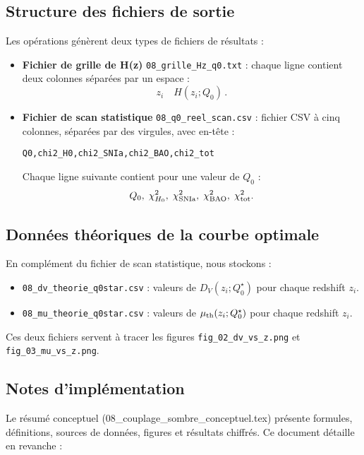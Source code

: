 \subsection{Structure des fichiers de sortie}

Les opérations génèrent deux types de fichiers de résultats :

\begin{itemize}
  \item \textbf{Fichier de grille de H(z)}  
    \texttt{08\_grille\_Hz\_q0.txt} : chaque ligne contient deux colonnes séparées par un espace :
    \[
      z_i 
      \quad H(z_i;Q_{0})\,.
    \]

  \item \textbf{Fichier de scan statistique}  
    \texttt{08\_q0\_reel\_scan.csv} : fichier CSV à cinq colonnes, séparées par des virgules, avec en-tête :
    \begin{verbatim}
Q0,chi2_H0,chi2_SNIa,chi2_BAO,chi2_tot
    \end{verbatim}
    Chaque ligne suivante contient pour une valeur de \(Q_{0}\) :
    \[
      Q_{0},\;\chi^{2}_{H_{0}},\;\chi^{2}_{\rm SNIa},\;\chi^{2}_{\rm BAO},\;\chi^{2}_{\rm tot}.
    \]
\end{itemize}

\subsection*{Données théoriques de la courbe optimale}

En complément du fichier de scan statistique, nous stockons :
\begin{itemize}
  \item \texttt{08\_dv\_theorie\_q0star.csv} : valeurs de \(D_V(z_i;Q_0^\star)\) pour chaque redshift \(z_i\).
  \item \texttt{08\_mu\_theorie\_q0star.csv} : valeurs de \(\mu_{\rm th}(z_i;Q_0^\star)\) pour chaque redshift \(z_i\).
\end{itemize}

Ces deux fichiers servent à tracer les figures  
\texttt{fig\_02\_dv\_vs\_z.png} et \texttt{fig\_03\_mu\_vs\_z.png}.

\subsection{Notes d’implémentation}

Le résumé conceptuel (08\_couplage\_sombre\_conceptuel.tex) présente formules, définitions, sources de données, figures et résultats chiffrés.  
Ce document détaille en revanche :

